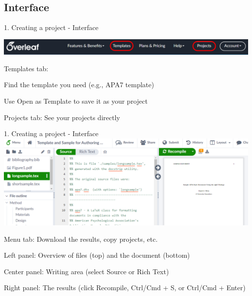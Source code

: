 \documentclass[13pt]{beamer}
\newcommand{\itemA}{\item[\textcolor{black}{\textbullet}]}
\newcommand{\itemB}{\item[\textcolor{black}{\textopenbullet}]}
\newcommand{\green}{\textcolor{colorgreen}}
\begin{document}
\subsection{Interface}
\begin{frame}{1. Creating a project - Interface}

\includegraphics[width=\textwidth,keepaspectratio]{images/ut_overleaf2.png}
\hfill \break

 \begin{fullpageitemize}
    \itemA \green{Templates} tab:\hfill \break

      \begin{fullpageitemize}
        \itemB Find the template you need (e.g., APA7 template)
        \itemB Use \green{Open as Template} to save it as your project
     \end{fullpageitemize}
     
    \itemA \green{Projects} tab: See your projects directly
 \end{fullpageitemize}

\end{frame}

\begin{frame}{1. Creating a project - Interface}
\includegraphics[width=\textwidth,keepaspectratio]{images/ut_overleaf3.png}

 \begin{fullpageitemize}
    \itemA \green{Menu} tab: Download the results, copy projects, etc.
    \itemA Left panel: Overview of files {\scriptsize(top)} and the document {\scriptsize(bottom)}
    \itemA Center panel: Writing area {\scriptsize(select \green{Source} or \green{Rich Text})}
    \itemA Right panel: The results {\scriptsize(click \green{Recompile}, Ctrl/Cmd + S, or Ctrl/Cmd + Enter)}
 \end{fullpageitemize}

\end{frame}
\end{document}
